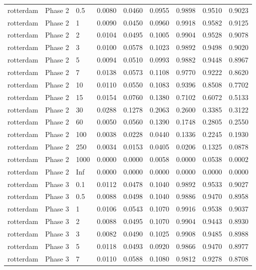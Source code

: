 \begin{tabular}{lllllllll}
  rotterdam & Phase 2 & 0.5 & 0.0080 & 0.0460 & 0.0955 & 0.9898 & 0.9510 & 0.9023 \\ 
  rotterdam & Phase 2 & 1 & 0.0090 & 0.0450 & 0.0960 & 0.9918 & 0.9582 & 0.9125 \\ 
  rotterdam & Phase 2 & 2 & 0.0104 & 0.0495 & 0.1005 & 0.9904 & 0.9528 & 0.9078 \\ 
  rotterdam & Phase 2 & 3 & 0.0100 & 0.0578 & 0.1023 & 0.9892 & 0.9498 & 0.9020 \\ 
  rotterdam & Phase 2 & 5 & 0.0094 & 0.0510 & 0.0993 & 0.9882 & 0.9448 & 0.8967 \\ 
  rotterdam & Phase 2 & 7 & 0.0138 & 0.0573 & 0.1108 & 0.9770 & 0.9222 & 0.8620 \\ 
  rotterdam & Phase 2 & 10 & 0.0110 & 0.0550 & 0.1083 & 0.9396 & 0.8508 & 0.7702 \\ 
  rotterdam & Phase 2 & 15 & 0.0154 & 0.0760 & 0.1380 & 0.7102 & 0.6072 & 0.5133 \\ 
  rotterdam & Phase 2 & 30 & 0.0288 & 0.1278 & 0.2063 & 0.2600 & 0.3385 & 0.3122 \\ 
  rotterdam & Phase 2 & 60 & 0.0050 & 0.0560 & 0.1390 & 0.1748 & 0.2805 & 0.2550 \\ 
  rotterdam & Phase 2 & 100 & 0.0038 & 0.0228 & 0.0440 & 0.1336 & 0.2245 & 0.1930 \\ 
  rotterdam & Phase 2 & 250 & 0.0034 & 0.0153 & 0.0405 & 0.0206 & 0.1325 & 0.0878 \\ 
  rotterdam & Phase 2 & 1000 & 0.0000 & 0.0000 & 0.0058 & 0.0000 & 0.0538 & 0.0002 \\ 
  rotterdam & Phase 2 & Inf & 0.0000 & 0.0000 & 0.0000 & 0.0000 & 0.0000 & 0.0000 \\ 
  rotterdam & Phase 3 & 0.1 & 0.0112 & 0.0478 & 0.1040 & 0.9892 & 0.9533 & 0.9027 \\ 
  rotterdam & Phase 3 & 0.5 & 0.0088 & 0.0498 & 0.1040 & 0.9886 & 0.9470 & 0.8958 \\ 
  rotterdam & Phase 3 & 1 & 0.0106 & 0.0543 & 0.1070 & 0.9916 & 0.9538 & 0.9037 \\ 
  rotterdam & Phase 3 & 2 & 0.0088 & 0.0495 & 0.1070 & 0.9904 & 0.9443 & 0.8930 \\ 
  rotterdam & Phase 3 & 3 & 0.0082 & 0.0490 & 0.1025 & 0.9908 & 0.9485 & 0.8988 \\ 
  rotterdam & Phase 3 & 5 & 0.0118 & 0.0493 & 0.0920 & 0.9866 & 0.9470 & 0.8977 \\ 
  rotterdam & Phase 3 & 7 & 0.0110 & 0.0588 & 0.1080 & 0.9812 & 0.9278 & 0.8708 \\ 

\end{tabular}
